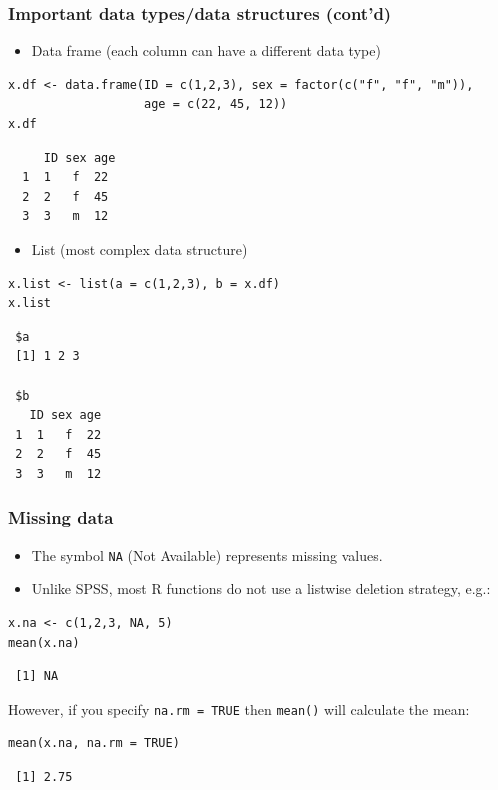 \documentclass[bigger]{beamer}
\begin{document}
\begin{frame}[fragile,shrink = 15]
\frametitle{Important data types/data structures (cont'd)}
\label{sec-1-1-15}

\begin{itemize}
\item Data frame (each column can have a different data type)
\end{itemize}

\lstset{language=R}
\begin{lstlisting}
x.df <- data.frame(ID = c(1,2,3), sex = factor(c("f", "f", "m")), 
                   age = c(22, 45, 12))
x.df
\end{lstlisting}

\begin{verbatim}
     ID sex age
  1  1   f  22
  2  2   f  45
  3  3   m  12
\end{verbatim}

 
\begin{itemize}
\item List (most complex data structure)
\end{itemize}

\lstset{language=R}
\begin{lstlisting}
x.list <- list(a = c(1,2,3), b = x.df)
x.list
\end{lstlisting}

\begin{verbatim}
 $a
 [1] 1 2 3
 
 $b
   ID sex age
 1  1   f  22
 2  2   f  45
 3  3   m  12
\end{verbatim}
\end{frame}
\begin{frame}[fragile]
\frametitle{Missing data}
\label{sec-1-1-16}

\begin{itemize}
\item The symbol \texttt{NA} (Not Available) represents missing values.
\item Unlike SPSS, most R functions do not use a listwise deletion strategy, e.g.:
\end{itemize}

\lstset{language=R}
\begin{lstlisting}
x.na <- c(1,2,3, NA, 5)
mean(x.na)
\end{lstlisting}

\begin{verbatim}
 [1] NA
\end{verbatim}

    However, if you specify \texttt{na.rm = TRUE} then \texttt{mean()} will calculate the mean:


\lstset{language=R}
\begin{lstlisting}
mean(x.na, na.rm = TRUE)
\end{lstlisting}

\begin{verbatim}
 [1] 2.75
\end{verbatim}

\end{frame}
\end{document}

